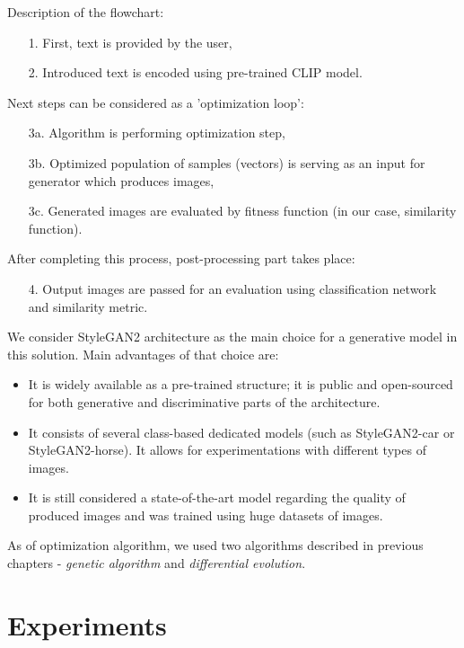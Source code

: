 \documentclass[12pt,a4paper,openany]{book}
\begin{document}
\noindent Description of the flowchart:
\begin{enumerate}
\item [1.] First, text is provided by the user,
\item [2.] Introduced text is encoded using pre-trained CLIP model.
\end{enumerate}
Next steps can be considered as a 'optimization loop':
\begin{enumerate}
\item [3a.] Algorithm is performing optimization step,
\item [3b.] Optimized population of samples (vectors)  is serving as an input for generator which produces images,
\item [3c.] Generated images are evaluated by fitness function (in our case, similarity function).
\end{enumerate}
\noindent After completing this process, post-processing part takes place:
\begin{enumerate}
\item [4.] Output images are passed for an evaluation using classification network and similarity metric.
\end{enumerate}

\noindent We consider StyleGAN2 architecture as the main choice for a generative model in this solution. Main advantages of that choice are:
\begin{itemize}
\item It is widely available as a pre-trained structure; it is public and open-sourced for both generative and discriminative parts of the architecture.
\item It consists of several class-based dedicated models (such as StyleGAN2-car or StyleGAN2-horse). It allows for experimentations with different types of images.
\item It is still considered a state-of-the-art model regarding the quality of produced images and was trained using huge datasets of images.
\end{itemize}

\noindent As of optimization algorithm, we used two algorithms described in previous chapters - \textit{genetic algorithm} and \textit{differential evolution}.



\chapter{Experiments}
\end{document}
